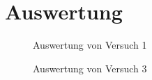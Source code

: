 \documentclass[12pt,a4paper,titlepage,headinclude,bibtotoc]{scrartcl}
\begin{document}
\section{Auswertung}
\label{sec:auswertung}
\begin{figure}[h]
\centering
{}
\caption{Auswertung von Versuch 1}
\label{fig:aus1}
\end{figure}
\begin{figure}[h]
\centering
{}
\caption{Auswertung von Versuch 3}
\label{fig:aus3}
\end{figure}
\end{document}

